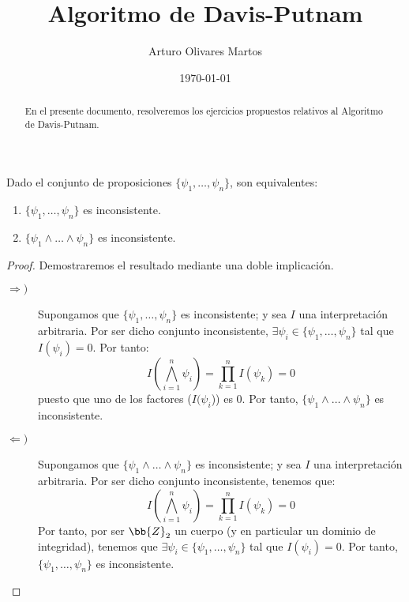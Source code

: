 \documentclass[12pt]{article}
\author{Arturo Olivares Martos}
\date{\today}
\title{Algoritmo de Davis-Putnam}
\begin{document}
    \maketitle
    \begin{abstract}
        En el presente documento, resolveremos los ejercicios propuestos relativos al Algoritmo de Davis-Putnam.
    \end{abstract}

    \begin{ejercicio}\label{ej:1}
        Dado el conjunto de proposiciones $\{\psi_1, \ldots, \psi_n\}$, son equivalentes:
        \begin{enumerate}
            \item $\{\psi_1, \ldots, \psi_n\}$ es inconsistente.
            \item $\{\psi_1 \land \ldots \land \psi_n\}$ es inconsistente.
        \end{enumerate}
        \begin{proof}
            Demostraremos el resultado mediante una doble implicación.
            \begin{description}
                \item[$\Longrightarrow)$]  Supongamos que $\{\psi_1, \ldots, \psi_n\}$ es inconsistente; y sea $I$ una interpretación arbitraria. Por ser dicho conjunto inconsistente, $\exists \psi_i \in \{\psi_1, \ldots, \psi_n\}$ tal que $I(\psi_i) = 0$. Por tanto:
                \begin{equation*}
                    I\left(\bigwedge_{i=1}^n \psi_i\right) = \prod_{k=1}^n I(\psi_k) = 0
                \end{equation*}
                puesto que uno de los factores ($I(\psi_i$)) es $0$. Por tanto, $\{\psi_1 \land \ldots \land \psi_n\}$ es inconsistente.

                \item[$\Longleftarrow)$] Supongamos que $\{\psi_1 \land \ldots \land \psi_n\}$ es inconsistente; y sea $I$ una interpretación arbitraria. Por ser dicho conjunto inconsistente, tenemos que:
                \begin{equation*}
                    I\left(\bigwedge_{i=1}^n \psi_i\right) = \prod_{k=1}^n I(\psi_k) = 0
                \end{equation*}
                Por tanto, por ser $\bb{Z}_2$ un cuerpo (y en particular un dominio de integridad), tenemos que $\exists \psi_i \in \{\psi_1, \ldots, \psi_n\}$ tal que $I(\psi_i) = 0$. Por tanto, $\{\psi_1, \ldots, \psi_n\}$ es inconsistente.
            \end{description}
        \end{proof}
    \end{ejercicio}
\end{document}
